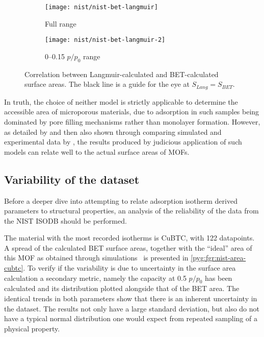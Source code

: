 \begin{figure}[htb]
	\centering

	\begin{subfigure}{0.42\linewidth}
		\texttt{[image: nist/nist-bet-langmuir]}
		\caption{Full range}%
		\label{pyg:fgr:nist-bet-langmuir}
	\end{subfigure}%
	\begin{subfigure}{0.5\linewidth}
		\texttt{[image: nist/nist-bet-langmuir-2]}
		\caption{0--0.15 \(p/p_0\) range}%
		\label{pyg:fgr:nist-bet-langmuir-adj}
	\end{subfigure}%

	\caption{Correlation between Langmuir-calculated and
		BET-calculated surface areas. The black line is a guide
		for the eye at \(S_{Lang} = S_{BET}\).}%
	\label{pyg:fgr:nist-area-cmp}
\end{figure}

In truth, the choice of neither model is strictly
applicable to determine the accessible area of microporous
materials, due to adsorption in such samples being dominated
by pore filling mechanisms rather than monolayer formation.
However, as detailed by
\citet{rouquerolBetEquationApplicable2007}
and then also shown through comparing simulated and
experimental data by
\citet{waltonApplicabilityBETMethod2007}, the results
produced by judicious application of such models can relate
well to the actual surface areas of MOFs.

\subsection{Variability of the dataset}

Before a deeper dive into attempting to relate adsorption isotherm
derived parameters to structural properties, an analysis of the
reliability of the data from the NIST ISODB should be performed.

The material with the most recorded isotherms is CuBTC, with
122 datapoints. A spread of the calculated BET surface areas,
together with the ``ideal'' area of this MOF as obtained
through simulations~\cite{parkHowReproducibleAre2017} is
presented in \autoref{pyg:fgr:nist-area-cubtc}.
To verify if the variability is due to uncertainty in the
surface area calculation a secondary metric, namely the
capacity at 0.5 \(p/p_0\) has been calculated and its
distribution plotted alongside that of the BET area. The
identical trends in both parameters show that there is an
inherent uncertainty in the dataset. The results not only
have a large standard deviation, but also do not have a
typical normal distribution one would expect from repeated
sampling of a physical property.

